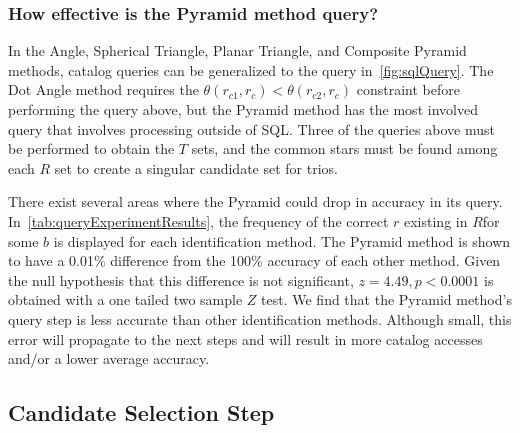 \subsubsection{How effective is the Pyramid method query?}
In the Angle, Spherical Triangle, Planar Triangle, and Composite Pyramid methods, catalog queries can be
generalized to the query in~\autoref{fig:sqlQuery}.
The Dot Angle method requires the $\theta(r_{c1}, r_{c}) < \theta(r_{c2}, r_c)$ constraint before performing the query
above, but the Pyramid method has the most involved query that involves processing outside of SQL\@.
Three of the queries above must be performed to obtain the $T$ sets, and the common stars must be
found among each $R$ set to create a singular candidate set for trios.

There exist several areas where the Pyramid could drop in accuracy in its query.
In~\autoref{tab:queryExperimentResults}, the frequency of the correct $r$ existing in $R$for some $b$ is displayed
for each identification method.
The Pyramid method is shown to have a 0.01\% difference from the 100\% accuracy of each other method.
Given the null hypothesis that this difference is not significant, $z= 4.49, p < 0.0001$ is obtained with a one tailed
two sample $Z$ test.
We find that the Pyramid method's query step is less accurate than other identification methods.
Although small, this error will propagate to the next steps and will result in more catalog accesses and/or a lower
average accuracy.

\subsection{Candidate Selection Step}\label{subsec:candidateSelectionStep}
\begin{figure}
\end{figure}

